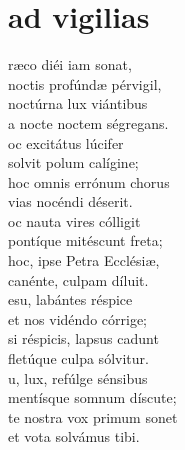 \thispagestyle{plain}
\section{ad vigilias}
\begin{center}
 {} 
\end{center}







\def\greinitialformat#1{{\fontsize{45}{45}\selectfont #1}}
\begin{multicols}{2}
 
\end{multicols}

\noindent{}ræco diéi iam sonat, \\
noctis profúndæ pérvigil, \\
noctúrna lux viántibus\\
a nocte noctem ségregans.\\

\noindent{}oc excitátus lúcifer\\
solvit polum calígine;\\
hoc omnis errónum chorus\\
vias nocéndi déserit.\\

\noindent{}oc nauta vires cólligit\\
pontíque mitéscunt freta;\\
hoc, ipse Petra Ecclésiæ, \\
canénte, culpam díluit.\\

\noindent{}esu, labántes réspice\\
et nos vidéndo córrige;\\
si réspicis, lapsus cadunt\\
fletúque culpa sólvitur.\\

\noindent{}u, lux, refúlge sénsibus\\
mentísque somnum díscute;\\
te nostra vox primum sonet\\
et vota solvámus tibi.\\

